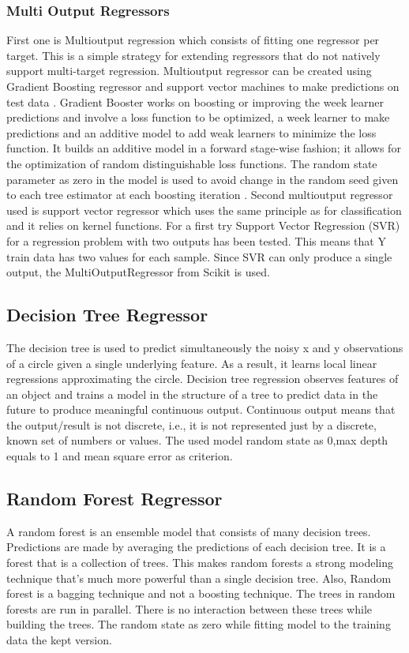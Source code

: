 \subsubsection{Multi Output Regressors}
First one is Multioutput regression which consists of fitting one regressor per target. This is a simple strategy for extending regressors that do not natively support multi-target regression. Multioutput regressor can be created using Gradient Boosting regressor and support vector machines to make predictions on test data \cite{scikit-learn}.\newline
Gradient Booster works on boosting or improving the week learner predictions and involve a loss function to be optimized, a week learner to make predictions and an additive model to add weak learners to minimize the loss function. It builds an additive model in a forward stage-wise fashion; it allows for the optimization of random distinguishable loss functions. The random state parameter as zero in the model is used to avoid change in the random seed given to each tree estimator at each boosting iteration \cite{scikit-learn:GradientBoostingRegressor}.\newline 
Second multioutput regressor used is support vector regressor which uses the same principle as for classification and it relies on kernel functions. For a first try Support Vector Regression (SVR) for a regression problem with two outputs has been tested. This means that Y train data has two values for each sample. Since SVR can only produce a single output, the MultiOutputRegressor from Scikit is used.
\subsection{Decision Tree Regressor}
The decision tree is used to predict simultaneously the noisy x and y observations of a circle given a single underlying feature. As a result, it learns local linear regressions approximating the circle. Decision tree regression observes features of an object and trains a model in the structure of a tree to predict data in the future to produce meaningful continuous output. Continuous output means that the output/result is not discrete, i.e., it is not represented just by a discrete, known set of numbers or values. The used model random state as 0,max depth equals to 1 and mean square error as criterion.\newline
\subsection{Random Forest Regressor}
A random forest is an ensemble model that consists of many decision trees. Predictions are made by averaging the predictions of each decision tree. It is a forest that is a collection of trees. This makes random forests a strong modeling technique that’s much more powerful than a single decision tree. Also, Random forest is a bagging technique and not a boosting technique. The trees in random forests are run in parallel. There is no interaction between these trees while building the trees. The random state as zero while fitting model to the training data the kept version.\newline
